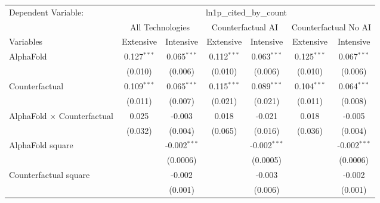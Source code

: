 \begingroup
\centering
\begin{tabular}{lcccccc}
   \tabularnewline \midrule \midrule
   Dependent Variable: & \multicolumn{6}{c}{ln1p\_cited\_by\_count}\\
 & \multicolumn{2}{c}{All Technologies} & \multicolumn{2}{c}{Counterfactual AI} & \multicolumn{2}{c}{Counterfactual No AI} \\
\cmidrule(lr){1-1}\cmidrule(lr){2-3} \cmidrule(lr){4-5} \cmidrule(lr){6-7}
Variables & \multicolumn{1}{c}{Extensive} & \multicolumn{1}{c}{Intensive} & \multicolumn{1}{c}{Extensive} & \multicolumn{1}{c}{Intensive} & \multicolumn{1}{c}{Extensive} & \multicolumn{1}{c}{Intensive} \\
\cmidrule(lr){1-1}\cmidrule(lr){2-2} \cmidrule(lr){3-3} \cmidrule(lr){4-4} \cmidrule(lr){5-5} \cmidrule(lr){6-6} \cmidrule(lr){7-7}
   AlphaFold                          & 0.127$^{***}$ & 0.065$^{***}$  & 0.112$^{***}$ & 0.063$^{***}$  & 0.125$^{***}$ & 0.067$^{***}$\\   
                                      & (0.010)       & (0.006)        & (0.010)       & (0.006)        & (0.010)       & (0.006)\\   
   Counterfactual                     & 0.109$^{***}$ & 0.065$^{***}$  & 0.115$^{***}$ & 0.089$^{***}$  & 0.104$^{***}$ & 0.064$^{***}$\\   
                                      & (0.011)       & (0.007)        & (0.021)       & (0.021)        & (0.011)       & (0.008)\\   
   AlphaFold $\times$ Counterfactual  & 0.025         & -0.003         & 0.018         & -0.021         & 0.018         & -0.005\\   
                                      & (0.032)       & (0.004)        & (0.065)       & (0.016)        & (0.036)       & (0.004)\\   
   AlphaFold square                   &               & -0.002$^{***}$ &               & -0.002$^{***}$ &               & -0.002$^{***}$\\   
                                      &               & (0.0006)       &               & (0.0005)       &               & (0.0006)\\   
   Counterfactual square              &               & -0.002         &               & -0.003         &               & -0.002\\   
                                      &               & (0.001)        &               & (0.006)        &               & (0.001)\\   

\end{tabular}
